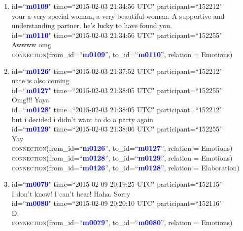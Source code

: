 \documentclass{article}
\begin{document}
\begin{enumerate}[resume]
\item id=``\textbf{\textcolor{blue}{m0109}}" time=``2015-02-03 21:34:56 UTC" participant=``152212" \\
your a very special woman, a very beautiful woman. A supportive and understanding partner. he's lucky to have found you.\\
id=``\textbf{\textcolor{blue}{m0110}}" time=``2015-02-03 21:34:56 UTC"  participant=``152255" \\
Awwww omg \\
\textsc{connection}(from\_id=``\textbf{\textcolor{blue}{m0109}}'', to\_id=``\textbf{\textcolor{blue}{m0110}}'', relation = Emotions)\\
\item id=``\textbf{\textcolor{blue}{m0126}}" time=``2015-02-03 21:37:52 UTC" participant=``152212" \\
nate is also coming \\
id=``\textbf{\textcolor{blue}{m0127}}" time=``2015-02-03 21:38:05 UTC" participant=``152255" \\
Omg!!! Yaya\\
id=``\textbf{\textcolor{blue}{m0128}}" time=``2015-02-03 21:38:05 UTC" participant=``152212"\\
but i decided i didn't want to do a party again\\
id=``\textbf{\textcolor{blue}{m0129}}" time=``2015-02-03 21:38:06 UTC" participant=``152255"\\
Yay\\
\textsc{connection}(from\_id=``\textbf{\textcolor{blue}{m0126}}'', to\_id=``\textbf{\textcolor{blue}{m0127}}'', relation = Emotions)\\
\textsc{connection}(from\_id=``\textbf{\textcolor{blue}{m0128}}'', to\_id=``\textbf{\textcolor{blue}{m0129}}'', relation = Emotions)\\
\textsc{connection}(from\_id=``\textbf{\textcolor{blue}{m0126}}'', to\_id=``\textbf{\textcolor{blue}{m0128}}'', relation = Elaboration)\\
\item id=``\textbf{\textcolor{blue}{m0079}}" time=``2015-02-09 20:19:25 UTC" participant=``152115"\\
I don't know! I can't hear! Haha. Sorry\\
id=``\textbf{\textcolor{blue}{m0080}}" time=``2015-02-09 20:20:10 UTC" participant=``152116"\\
D:\\
\textsc{connection}(from\_id=``\textbf{\textcolor{blue}{m0079}}'', to\_id=``\textbf{\textcolor{blue}{m0080}}'', relation = Emotions)\\
\end{enumerate}
\end{document}
